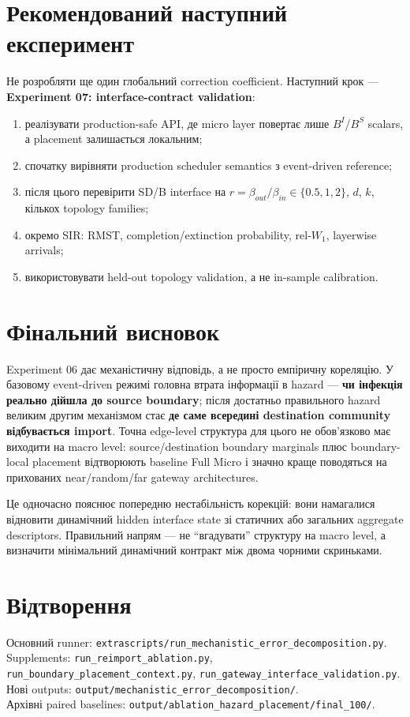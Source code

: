 \documentclass[11pt,a4paper]{article}
\begin{document}
\section{Рекомендований наступний експеримент}
Не розробляти ще один глобальний correction coefficient. Наступний крок --- \textbf{Experiment 07: interface-contract validation}:
\begin{enumerate}
\item реалізувати production-safe API, де micro layer повертає лише $B^I$/$B^S$ scalars, а placement залишається локальним;
\item спочатку вирівняти production scheduler semantics з event-driven reference;
\item після цього перевірити SD/B interface на $r=\beta_{out}/\beta_{in}\in\{0.5,1,2\}$, $d$, $k$, кількох topology families;
\item окремо SIR: RMST, completion/extinction probability, rel-$W_1$, layerwise arrivals;
\item використовувати held-out topology validation, а не in-sample calibration.
\end{enumerate}

\section{Фінальний висновок}
Experiment 06 дає механістичну відповідь, а не просто емпіричну кореляцію. У базовому event-driven режимі головна втрата інформації в hazard --- \textbf{чи інфекція реально дійшла до source boundary}; після достатньо правильного hazard великим другим механізмом стає \textbf{де саме всередині destination community відбувається import}. Точна edge-level структура для цього не обов'язково має виходити на macro level: source/destination boundary marginals плюс boundary-local placement відтворюють baseline Full Micro і значно краще поводяться на прихованих near/random/far gateway architectures.

Це одночасно пояснює попередню нестабільність корекцій: вони намагалися відновити динамічний hidden interface state зі статичних або загальних aggregate descriptors. Правильний напрям --- не ``вгадувати'' структуру на macro level, а визначити мінімальний динамічний контракт між двома чорними скриньками.

\section*{Відтворення}
Основний runner: \texttt{extrascripts/run\_mechanistic\_error\_decomposition.py}.\\
Supplements: \texttt{run\_reimport\_ablation.py}, \texttt{run\_boundary\_placement\_context.py}, \texttt{run\_gateway\_interface\_validation.py}.\\
Нові outputs: \texttt{output/mechanistic\_error\_decomposition/}.\\
Архівні paired baselines: \texttt{output/ablation\_hazard\_placement/final\_100/}.
\end{document}
